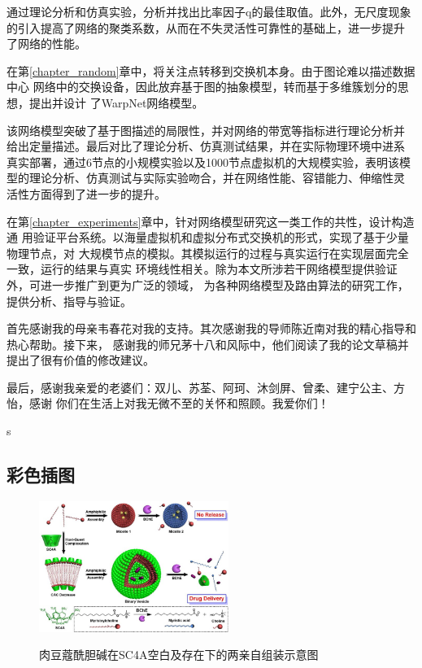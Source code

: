 \documentclass[bachelor,winfonts]{jnuthesis} %
\begin{document}
    通过理论分析和仿真实验，分析并找出比率因子q的最佳取值。此外，无尺度现象
    的引入提高了网络的聚类系数，从而在不失灵活性可靠性的基础上，进一步提升
    了网络的性能。
    
    在第\ref{chapter_random}章中，将关注点转移到交换机本身。由于图论难以描述数据中心
    网络中的交换设备，因此放弃基于图的抽象模型，转而基于多维簇划分的思想，提出并设计
    了WarpNet网络模型。
    
    该网络模型突破了基于图描述的局限性，并对网络的带宽等指标进行理论分析并
    给出定量描述。最后对比了理论分析、仿真测试结果，并在实际物理环境中进系
    真实部署，通过6节点的小规模实验以及1000节点虚拟机的大规模实验，表明该模
    型的理论分析、仿真测试与实际实验吻合，并在网络性能、容错能力、伸缩性灵
    活性方面得到了进一步的提升。
    
    在第\ref{chapter_experiments}章中，针对网络模型研究这一类工作的共性，设计构造通
    用验证平台系统。以海量虚拟机和虚拟分布式交换机的形式，实现了基于少量物理节点，对
    大规模节点的模拟。其模拟运行的过程与真实运行在实现层面完全一致，运行的结果与真实
    环境线性相关。除为本文所涉若干网络模型提供验证外，可进一步推广到更为广泛的领域，
    为各种网络模型及路由算法的研究工作，提供分析、指导与验证。
    
    

    \begin{acknowledgement}
        首先感谢我的母亲韦春花对我的支持。其次感谢我的导师陈近南对我的精心指导和热心帮助。接下来，
        感谢我的师兄茅十八和风际中，他们阅读了我的论文草稿并提出了很有价值的修改建议。
        
        最后，感谢我亲爱的老婆们：双儿、苏荃、阿珂、沐剑屏、曾柔、建宁公主、方怡，感谢
        你们在生活上对我无微不至的关怀和照顾。我爱你们！
    \end{acknowledgement}
    s
    \begin{appendix}
    \chapter{彩色插图}
    \begin{figure}[htbp]
        \centering
        \includegraphics[width= 0.55\textwidth]{Figure/Ch1-SC4A}\\
        \caption{肉豆蔻酰胆碱在SC4A空白及存在下的两亲自组装示意图}
    \end{figure}
    \end{appendix}
\end{document}
